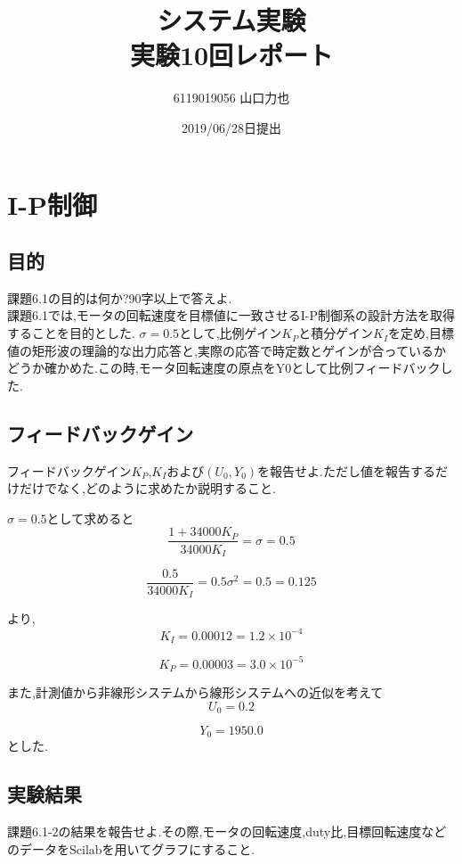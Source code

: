 \documentclass{jarticle}
\title{{システム実験}\\実験10回レポート}
\author{6119019056 山口力也}
\date{2019/06/28日提出}
\begin{document}
\maketitle
\section{I-P制御}
\subsection{目的}
課題6.1の目的は何か?90字以上で答えよ. \\

課題6.1では,モータの回転速度を目標値に一致させるI-P制御系の設計方法を取得することを目的とした.
$\sigma = 0.5$として,比例ゲイン$K_P$と積分ゲイン$K_I$を定め,目標値の矩形波の理論的な出力応答と,実際の応答で時定数とゲインが合っているかどうか確かめた.この時,モータ回転速度の原点をY0として比例フィードバックした.
\subsection{フィードバックゲイン}
フィードバックゲイン$K_P$,$K_I$および$(U_0,Y_0)$を報告せよ.ただし値を報告するだけだけでなく,どのように求めたか説明すること.


$\sigma= 0.5$として求めると
\begin{equation}
\frac{1 + 34000K_P}{34000K_I} = \sigma = 0.5
\end{equation}

\begin{equation}
\frac{0.5}{34000K_I} = 0.5\sigma^2 = 0.5 = 0.125
\end{equation}

より,
\begin{equation}
K_I = 0.00012 = 1.2 \times 10 ^{-4}
\end{equation}

\begin{equation}
K_P = 0.00003 = 3.0 \times 10 ^{-5}
\end{equation}

また,計測値から非線形システムから線形システムへの近似を考えて
\begin{equation}
U_0 = 0.2
\end{equation}

\begin{equation}
Y_0 = 1950.0
\end{equation}
とした.

\subsection{実験結果}
課題6.1-2の結果を報告せよ.その際,モータの回転速度,duty比,目標回転速度などのデータをScilabを用いてグラフにすること. \\
\end{document}

